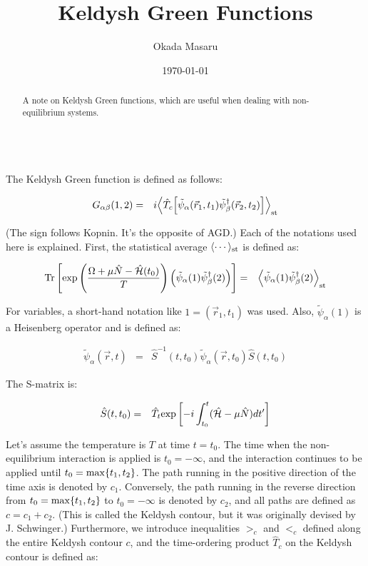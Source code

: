 \documentclass[uplatex,a4j,12pt,dvipdfmx]{jsarticle}
\title{
Keldysh Green Functions
}
\author{Okada Masaru}
\date{\today}
\begin{document}
\maketitle

\begin{abstract}
	A note on Keldysh Green functions, which are useful when dealing with non-equilibrium systems.
\end{abstract}

\ \\

The Keldysh Green function is defined as follows:

\begin{eqnarray}
	G_{\alpha \beta}(1,2)
	&=&
	i \Big\langle \hat{T}_{c} \Big[ \tilde{\psi}_{\alpha}(\vec{r}_{1},t_{1}) \tilde{\psi}_{\beta}^{\dagger}(\vec{r}_{2},t_{2}) \Big] \Big\rangle_{\rm st}
\end{eqnarray}

(The sign follows Kopnin. It's the opposite of AGD.)
Each of the notations used here is explained.
First, the statistical average $\langle \cdots \rangle_{\rm st}$ is defined as:

\begin{eqnarray}
	{\rm Tr}
	\left[ {\rm exp} \left( \dfrac{\Omega + \mu \hat{N} - \hat{\mathcal{H}}(t_{0}) }{T} \right)
		\Big( \tilde{\psi}_{\alpha}(1) \tilde{\psi}_{\beta}^{\dagger}(2) \Big)
		\right]
	&=&
	\Big\langle \tilde{\psi}_{\alpha}(1) \tilde{\psi}_{\beta}^{\dagger}(2) \Big\rangle_{\rm st}
\end{eqnarray}

For variables, a short-hand notation like $1=(\vec{r}_{1},t_{1})$ was used. Also, $\tilde{\psi}_{\alpha}(1)$ is a Heisenberg operator and is defined as:

\begin{eqnarray}
	\tilde{\psi}_{\alpha}(\vec{r},t)
	&=&
	\hat{S}^{-1}(t,t_{0})
	\tilde{\psi}_{\alpha}(\vec{r},t_{0})
	\hat{S}(t,t_{0})
\end{eqnarray}

The S-matrix is:

\begin{eqnarray}
	\hat{S}(t,t_{0})
	&=&
	\hat{T}_{t}
	{\rm exp} \left[ - i \int^{t}_{t_{0}} ( \hat{\mathcal{H}} - \mu \hat{N} ) dt' \right]
\end{eqnarray}

Let's assume the temperature is $T$ at time $t=t_{0}$.
The time when the non-equilibrium interaction is applied is $t_{0} = - \infty$, and the interaction continues to be applied until $t_{0}={\rm max} \{ t_{1},t_{2}\}$.
The path running in the positive direction of the time axis is denoted by $c_{1}$.
Conversely, the path running in the reverse direction from $t_{0}={\rm max} \{ t_{1},t_{2}\}$ to $t_{0} = - \infty$ is denoted by $c_{2}$, and all paths are defined as $c=c_{1}+c_{2}$.
(This is called the Keldysh contour, but it was originally devised by J. Schwinger.)
Furthermore, we introduce inequalities $>_{c}$ and $<_{c}$ defined along the entire Keldysh contour $c$, and the time-ordering product $\hat{T}_{c}$ on the Keldysh contour is defined as:
\end{document}

